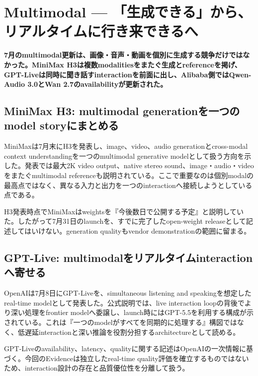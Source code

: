 \section{Multimodal — 「生成できる」から、リアルタイムに行き来できるへ}
\noindent\textbf{7月のmultimodal更新は、画像・音声・動画を個別に生成する競争だけではなかった。MiniMax H3は複数modalitiesをまたぐ生成とreferenceを掲げ、GPT-Liveは同時に聞き話すinteractionを前面に出し、Alibaba側ではQwen-Audio 3.0とWan 2.7のavailabilityが更新された。}\autocite{src-3fb14968493d,src-d8e13386974c,src-eac8dfbeb78c}

\subsection{MiniMax H3: multimodal generationを一つのmodel storyにまとめる}

MiniMaxは7月末にH3を発表し、image、video、audio generationとcross-modal context understandingを一つのmultimodal generative modelとして扱う方向を示した。発表では最大2K video output、native stereo sound、image・audio・videoをまたぐmultimodal referenceも説明されている。ここで重要なのは個別modalの最高点ではなく、異なる入力と出力を一つのinteractionへ接続しようとしている点である。\autocite{src-d8e13386974c}


\begin{claimboundary}
H3発表時点でMiniMaxはweightsを『今後数日で公開する予定』と説明していた。したがって7月31日のlaunchを、すでに完了したopen-weight releaseとして記述してはいけない。generation qualityもvendor demonstrationの範囲に留まる。\autocite{src-d8e13386974c}
\end{claimboundary}

\subsection{GPT-Live: multimodalをリアルタイムinteractionへ寄せる}

OpenAIは7月8日にGPT-Liveを、simultaneous listening and speakingを想定したreal-time modelとして発表した。公式説明では、live interaction loopの背後でより深い処理をfrontier modelへ委譲し、launch時にはGPT-5.5を利用する構成が示されている。これは『一つのmodelがすべてを同期的に処理する』構図ではなく、低遅延interactionと深い推論を役割分担するarchitectureとして読める。\autocite{src-3fb14968493d}


\begin{claimboundary}
GPT-Liveのavailability、latency、qualityに関する記述はOpenAIの一次情報に基づく。今回のEvidenceは独立したreal-time quality評価を確立するものではないため、interaction設計の存在と品質優位性を分離して扱う。\autocite{src-3fb14968493d}
\end{claimboundary}

